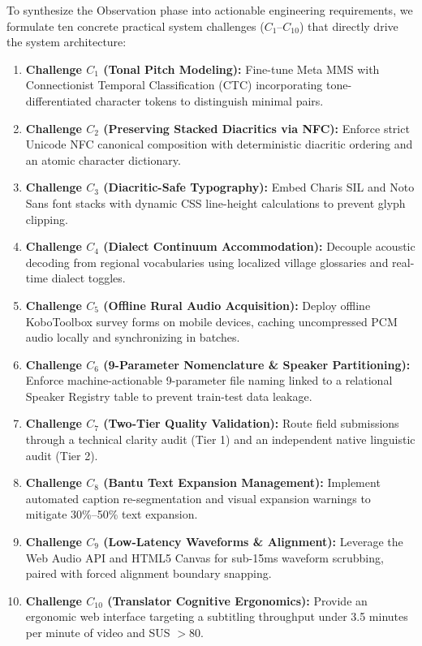 \documentclass[conference]{IEEEtran}
\begin{document}
To synthesize the Observation phase into actionable engineering requirements, we formulate ten concrete practical system challenges ($C_1$--$C_{10}$) that directly drive the system architecture:
\begin{enumerate}
    \item \textbf{Challenge $C_1$ (Tonal Pitch Modeling):} Fine-tune Meta MMS with Connectionist Temporal Classification (CTC) incorporating tone-differentiated character tokens to distinguish minimal pairs.
    \item \textbf{Challenge $C_2$ (Preserving Stacked Diacritics via NFC):} Enforce strict Unicode NFC canonical composition with deterministic diacritic ordering and an atomic character dictionary.
    \item \textbf{Challenge $C_3$ (Diacritic-Safe Typography):} Embed Charis SIL and Noto Sans font stacks with dynamic CSS line-height calculations to prevent glyph clipping.
    \item \textbf{Challenge $C_4$ (Dialect Continuum Accommodation):} Decouple acoustic decoding from regional vocabularies using localized village glossaries and real-time dialect toggles.
    \item \textbf{Challenge $C_5$ (Offline Rural Audio Acquisition):} Deploy offline KoboToolbox survey forms on mobile devices, caching uncompressed PCM audio locally and synchronizing in batches.
    \item \textbf{Challenge $C_6$ (9-Parameter Nomenclature \& Speaker Partitioning):} Enforce machine-actionable 9-parameter file naming linked to a relational Speaker Registry table to prevent train-test data leakage.
    \item \textbf{Challenge $C_7$ (Two-Tier Quality Validation):} Route field submissions through a technical clarity audit (Tier 1) and an independent native linguistic audit (Tier 2).
    \item \textbf{Challenge $C_8$ (Bantu Text Expansion Management):} Implement automated caption re-segmentation and visual expansion warnings to mitigate 30\%--50\% text expansion.
    \item \textbf{Challenge $C_9$ (Low-Latency Waveforms \& Alignment):} Leverage the Web Audio API and HTML5 Canvas for sub-15ms waveform scrubbing, paired with forced alignment boundary snapping.
    \item \textbf{Challenge $C_{10}$ (Translator Cognitive Ergonomics):} Provide an ergonomic web interface targeting a subtitling throughput under 3.5 minutes per minute of video and SUS $>80$.
\end{enumerate}
\end{document}
